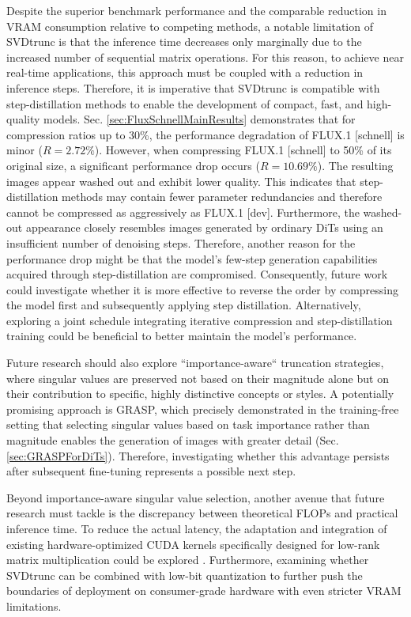 Despite the superior benchmark performance and the comparable reduction in \gls{VRAM} consumption relative to competing methods, a notable limitation of \gls{SVD}trunc is that the inference time decreases only marginally due to the increased number of sequential matrix operations. For this reason, to achieve near real-time applications, this approach must be coupled with a reduction in inference steps. Therefore, it is imperative that \gls{SVD}trunc is compatible with step-distillation methods to enable the development of compact, fast, and high-quality models. Sec. \ref{sec:FluxSchnellMainResults} demonstrates that for compression ratios up to 30\%, the performance degradation of FLUX.1 {[schnell]} is minor ($R=2.72\%$). However, when compressing FLUX.1 {[schnell]} to 50\% of its original size, a significant performance drop occurs ($R=10.69\%$). The resulting images appear washed out and exhibit lower quality. This indicates that step-distillation methods may contain fewer parameter redundancies and therefore cannot be compressed as aggressively as FLUX.1 {[dev]}. Furthermore, the washed-out appearance closely resembles images generated by ordinary \gls{DiT}s using an insufficient number of denoising steps. Therefore, another reason for the performance drop might be that the model's few-step generation capabilities acquired through step-distillation are compromised. Consequently, future work could investigate whether it is more effective to reverse the order by compressing the model first and subsequently applying step distillation. Alternatively, exploring a joint schedule integrating iterative compression and step-distillation training could be beneficial to better maintain the model's performance.


Future research should also explore ``importance-aware`` truncation strategies, where singular values are preserved not based on their magnitude alone but on their contribution to specific, highly distinctive concepts or styles. A potentially promising approach is \gls{GRASP}, which precisely demonstrated in the training-free setting that selecting singular values based on task importance rather than magnitude enables the generation of images with greater detail (Sec. \ref{sec:GRASPForDiTs}). Therefore, investigating whether this advantage persists after subsequent fine-tuning represents a possible next step.

Beyond importance-aware singular value selection, another avenue that future research must tackle is the discrepancy between theoretical FLOPs and practical inference time. To reduce the actual latency, the adaptation and integration of existing hardware-optimized CUDA kernels specifically designed for low-rank matrix multiplication could be explored \cite{li2024svdquant,zhang2025sla}. Furthermore, examining whether \gls{SVD}trunc can be combined with low-bit quantization to further push the boundaries of deployment on consumer-grade hardware with even stricter \gls{VRAM} limitations.